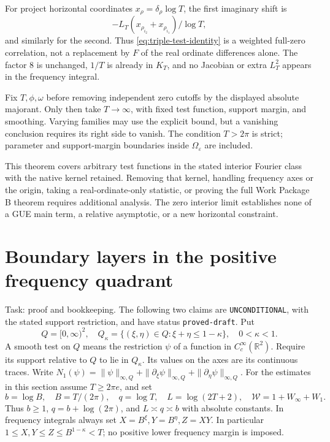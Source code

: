 \documentclass[11pt]{article}
\begin{document}
For project horizontal coordinates \(x_\rho=\delta_\rho\log T\),
the first imaginary shift is
\[
 -L_T(x_{\rho_{i_2}}+x_{\rho_{i_1}})/\log T,
\]
and similarly for the second.
Thus \eqref{eq:triple-test-identity} is a weighted full-zero correlation,
not a replacement by \(F\) of the real ordinate differences alone.
The factor \(8\) is unchanged, \(1/T\) is already in \(K_T\), and no
Jacobian or extra \(L_T^2\) appears in the frequency integral.

Fix \(T,\phi,\omega\) before removing independent zero cutoffs by the
displayed absolute majorant. Only then take \(T\to\infty\), with fixed
test function, support margin, and smoothing. Varying families may use
the explicit bound, but a vanishing conclusion requires its right side
to vanish. The condition \(T>2\pi\) is strict; parameter and support-margin
boundaries inside \(\Omega_\varepsilon\) are included.

This theorem covers arbitrary test functions in the stated interior
Fourier class with the native kernel retained. Removing that kernel,
handling frequency axes or the origin, taking a real-ordinate-only
statistic, or proving the full Work Package B theorem requires additional
analysis. The zero interior limit establishes none of a GUE main term,
a relative asymptotic, or a new horizontal constraint.
\section{Boundary layers in the positive frequency quadrant}

Task: proof and bookkeeping. The following two claims are
\texttt{UNCONDITIONAL}, with the stated support restriction, and have
status \texttt{proved-draft}. Put
\[
 Q=[0,\infty)^2,\quad Q_\kappa=\{(\xi,\eta)\in Q:\xi+\eta\leq1-\kappa\},
 \quad 0<\kappa<1.
\]
A smooth test on \(Q\) means the restriction \(\psi\) of a function in
\(C_c^\infty(\mathbb R^2)\). Require its support relative to \(Q\) to
lie in \(Q_\kappa\). Its values on the axes are its continuous traces.
Write \(N_1(\psi)=\|\psi\|_{\infty,Q}+
\|\partial_\xi\psi\|_{\infty,Q}+\|\partial_\eta\psi\|_{\infty,Q}\).
For the estimates in this section assume \(T\geq2\pi e\), and set
\[
 b=\log B,\quad B=T/(2\pi),\quad q=\log T,
 \quad L=\log(2T+2),\quad \mathcal W=1+W_\infty+W_1.
\]
Thus \(b\geq1\), \(q=b+\log(2\pi)\), and \(L\asymp q\asymp b\)
with absolute constants. In frequency integrals always set
\(X=B^\xi,Y=B^\eta,Z=XY\). In particular
\(1\leq X,Y\leq Z\leq B^{1-\kappa}<T\); no positive lower
frequency margin is imposed.
\end{document}
